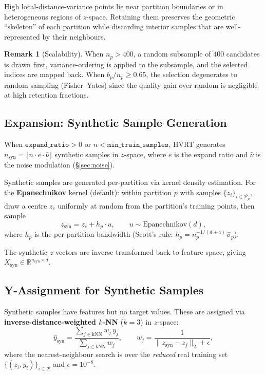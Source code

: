 \documentclass[11pt,a4paper]{article}
\newcommand{\R}{\mathbb{R}}
\theoremstyle{definition}
\newtheorem{remark}{Remark}
\begin{document}
High local-distance-variance points lie near partition boundaries or in
heterogeneous regions of $z$-space.  Retaining them preserves the geometric
``skeleton'' of each partition while discarding interior samples that are
well-represented by their neighbours.

\begin{remark}[Scalability]
When $n_p > 400$, a random subsample of $400$ candidates is drawn first,
variance-ordering is applied to the subsample, and the selected indices are
mapped back.  When $b_p / n_p \ge 0.65$, the selection degenerates to random
sampling (Fisher--Yates) since the quality gain over random is negligible at
high retention fractions.
\end{remark}

\subsection{Expansion: Synthetic Sample Generation}

When $\texttt{expand\_ratio} > 0$ or $n < \texttt{min\_train\_samples}$,
HVRT generates $n_{\text{syn}} = \lfloor n \cdot e \cdot \hat{\nu} \rfloor$
synthetic samples in $z$-space, where $e$ is the expand ratio and
$\hat{\nu}$ is the noise modulation (\S\ref{sec:noise}).

Synthetic samples are generated per-partition via kernel density estimation.
For the \textbf{Epanechnikov} kernel (default): within partition $p$ with
samples $\{z_i\}_{i \in \mathcal{P}_p}$, draw a centre $z_c$ uniformly at
random from the partition's training points, then sample
\begin{equation}
    z_{\text{syn}} = z_c + h_p \cdot u, \qquad u \sim \text{Epanechnikov}(d),
\end{equation}
where $h_p$ is the per-partition bandwidth (Scott's rule:
$h_p = n_p^{-1/(d+4)}\,\hat{\sigma}_p$).

The synthetic $z$-vectors are inverse-transformed back to feature space,
giving $X_{\text{syn}} \in \R^{n_{\text{syn}} \times d}$.

\subsection{Y-Assignment for Synthetic Samples}
\label{sec:knn}

Synthetic samples have features but no target values.  These are assigned
via \textbf{inverse-distance-weighted $k$-NN} ($k = 3$) in $z$-space:
\begin{equation}
    \hat{y}_{\text{syn}} = \frac{\sum_{j \in \text{kNN}} w_j \, y_j}{\sum_{j \in \text{kNN}} w_j},
    \qquad
    w_j = \frac{1}{\|z_{\text{syn}} - z_j\|_2 + \epsilon},
\end{equation}
where the nearest-neighbour search is over the \emph{reduced} real training
set $\{(z_i, y_i)\}_{i \in \mathcal{R}}$ and $\epsilon = 10^{-8}$.
\end{document}
